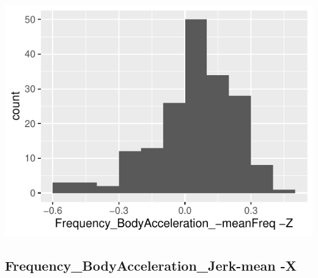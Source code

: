 \documentclass[
]{article}
\begin{document}
\begin{minipage}{0.25 \textwidth}

\includegraphics{codebook_tidydatasub_files/figure-latex/Var-51-Frequency-BodyAcceleration--meanFreq--Z-1.pdf}

\end{minipage}

\noindent\makebox[\linewidth]{\rule{\textwidth}{0.4pt}}

\hypertarget{frequency_bodyacceleration_jerk-mean--x}{%
\subsection{Frequency\_BodyAcceleration\_Jerk-mean
-X}\label{frequency_bodyacceleration_jerk-mean--x}}
\end{document}

